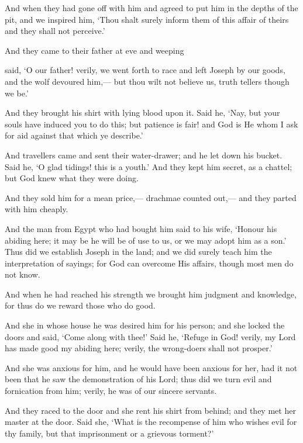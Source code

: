 \documentclass[fontsize=14pt, letterpaper, notitlepage, openany, DIV=12]{scrbook} %
\begin{document}
\noindent[12:15]
And when they had gone off with him and agreed to put him in the depths of the pit, and
we inspired him, `Thou shalt surely inform them of this affair of theirs and they shall not
perceive.'

\noindent[12:16]
And they came to their father at eve and weeping

\noindent[12:17]
said, `O our father! verily, we went forth to race and left Joseph by our goods, and the
wolf devoured him,--- but thou wilt not believe us, truth tellers though we be.'

\noindent[12:18]
And they brought his shirt with lying blood upon it. Said he, `Nay, but your souls have
induced you to do this; but patience is fair! and God is He whom I ask for aid against that which
ye describe.'

\noindent[12:19]
And travellers came and sent their water-drawer; and he let down his bucket. Said he, `O
glad tidings! this is a youth.' And they kept him secret, as a chattel; but God knew what they
were doing.

\noindent[12:20]
And they sold him for a mean price,--- drachmae counted out,--- and they parted with
him cheaply.

\noindent[12:21]
And the man from Egypt who had bought him said to his wife, `Honour his abiding here;
it may be he will be of use to us, or we may adopt him as a son.' Thus did we establish Joseph in
the land; and we did surely teach him the interpretation of sayings; for God can overcome His
affairs, though most men do not know.

\noindent[12:22]
And when he had reached his strength we brought him judgment and knowledge, for thus
do we reward those who do good.

\noindent[12:23]
And she in whose house he was desired him for his person; and she locked the doors and
said, `Come along with thee!' Said he, `Refuge in God! verily, my Lord has made good my
abiding here; verily, the wrong-doers shall not prosper.'

\noindent[12:24]
And she was anxious for him, and he would have been anxious for her, had it not been
that he saw the demonstration of his Lord; thus did we turn evil and fornication from him; verily,
he was of our sincere servants.

\noindent[12:25]
And they raced to the door and she rent his shirt from behind; and they met her master at
the door. Said she, `What is the recompense of him who wishes evil for thy family, but that
imprisonment or a grievous torment?'
\end{document}
